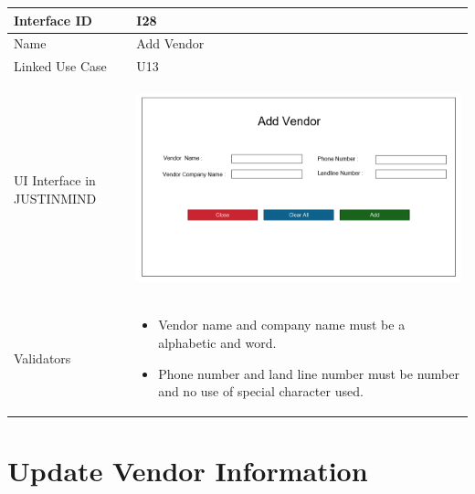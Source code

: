 \documentclass[12pt,a4paper]{report}
\begin{document}
\begin{tabular}{ | m{3cm} | m{12cm}| } \hline

Interface ID & I28  \\\hline

Name  &  Add Vendor \\ \hline

Linked Use Case & U13	 \\ \hline

UI Interface in JUSTINMIND & \begin{center} \includegraphics[scale=0.3]{./User Interface/UI-027Add Vendor@1x.png}\end{center}  \\ \hline

Validators & 
\begin{itemize}
\item   Vendor name and company name must be a alphabetic and word.
\item   Phone number and land line number must be number and no use of special character used. 
\end{itemize}
\\ \hline
\end{tabular}
\section{Update Vendor Information}
\end{document}
